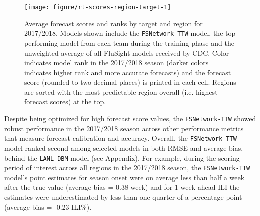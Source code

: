 \documentclass{article}\usepackage[]{graphicx}\usepackage[]{color}
\newenvironment{knitrout}{}{} %
\begin{document}
 
\begin{knitrout}
\color{fgcolor}\begin{figure}
\texttt{[image: figure/rt-scores-region-target-1]} \caption[Average forecast scores and ranks by target and region for 2017/2018]{Average forecast scores and ranks by target and region for 2017/2018. Models shown include the {\tt FSNetwork-TTW} model, the top performing model from each team during the training phase and the unweighted average of all FluSight models received by CDC. Color indicates model rank in the 2017/2018 season (darker colors indicates higher rank and more accurate forecasts) and the forecast score (rounded to two decimal places) is printed in each cell. Regions are sorted with the most predictable region overall (i.e. highest forecast scores) at the top.}\label{fig:rt-scores-region-target}
\end{figure}


\end{knitrout}
 
 






Despite being optimized for high forecast score values, the {\tt FSNetwork-TTW} showed robust performance in the 2017/2018 season across other performance metrics that measure forecast calibration and accuracy.
Overall, the {\tt FSNetwork-TTW} model ranked second among selected models in both RMSE and average bias, behind the {\tt LANL-DBM} model (see Appendix).
For example, during the scoring period of interest across all regions in the 2017/2018 season, the {\tt FSNetwork-TTW} model's point estimates for season onset were on average less than half a week after the true value (average bias =
0.38
week) and for 1-week ahead ILI the estimates were underestimated by less than one-quarter of a percentage point (average bias =
-0.23
ILI\%).
\end{document}
